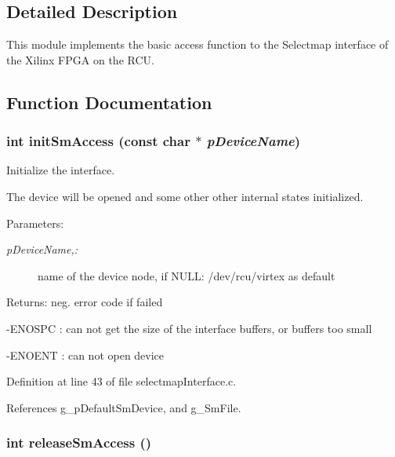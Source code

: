 \subsection{Detailed Description}
This module implements the basic access function to the Selectmap interface of the Xilinx FPGA on the RCU. 



\subsection{Function Documentation}
\hypertarget{group__selectmap__access_g3a82967a2ac2933832a98aa2d822fd7b}{
\subsubsection[initSmAccess]{\setlength{\rightskip}{0pt plus 5cm}int init\-Sm\-Access (const char $\ast$ {\em p\-Device\-Name})}}
\label{group__selectmap__access_g3a82967a2ac2933832a98aa2d822fd7b}


Initialize the interface. 

The device will be opened and some other other internal states initialized. \begin{Desc}
\item[Parameters:]
\begin{description}
\item[{\em p\-Device\-Name,:}]name of the device node, if NULL: /dev/rcu/virtex as default \end{description}
\end{Desc}
\begin{Desc}
\item[Returns:]neg. error code if failed\par
 -ENOSPC : can not get the size of the interface buffers, or buffers too small\par
 -ENOENT : can not open device \end{Desc}


Definition at line 43 of file selectmap\-Interface.c.

References g\_\-p\-Default\-Sm\-Device, and g\_\-Sm\-File.\hypertarget{group__selectmap__access_g75466b7556397eb41108eb84212c5b19}{
\subsubsection[releaseSmAccess]{\setlength{\rightskip}{0pt plus 5cm}int release\-Sm\-Access ()}}
\label{group__selectmap__access_g75466b7556397eb41108eb84212c5b19}


